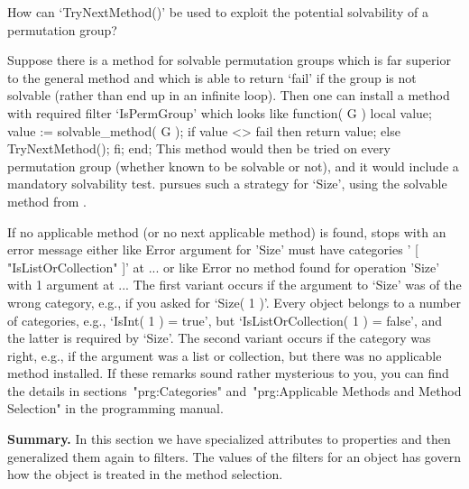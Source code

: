%
\exercise How  can  `TryNextMethod()' be used   to exploit  the potential
solvability of a permutation group?

\answer Suppose  there is a method for  solvable permutation groups which
is far superior to the general method and which  is able to return `fail'
if the  group is not solvable  (rather than end up  in an infinite loop).
Then one can install a  method with  required filter `IsPermGroup'  which
looks like
\begintt
    function( G )
    local  value;
        value := solvable_method( G );
        if value <> fail  then  return value;
                          else  TryNextMethod();  fi;
    end;
\endtt
This method would then be tried on every permutation group (whether known
to be  solvable or  not),  and it would  include a  mandatory solvability
test.  {\GAP} pursues  such  a strategy for   `Size',  using the solvable
method from \cite{Sims90b}.

\edef\solsimsex{\the\chapno.\the\exno}%
If no applicable method  (or no next applicable  method) is found, {\GAP}
stops with an error message either like
\begintt
    Error argument for 'Size' must have categories '
    [ "IsListOrCollection" ]' at ...
\endtt
or like
\begintt
    Error no method found for operation 'Size' with 1 argument at ...
\endtt
The  first variant occurs  if the  argument to   `Size' was of  the wrong
category, e.g., if you asked for `Size( 1 )'. Every {\GAP} object belongs
to  a  number of     categories,   e.g., `IsInt(   1    ) =  true',   but
`IsListOrCollection( 1 ) = false', and  the latter is required by `Size'.
The  second variant   occurs if the   category  was right, e.g.,   if the
argument  was a list  or collection,  but there  was no applicable method
installed. If these remarks sound rather mysterious  to you, you can find
the details in  sections~"prg:Categories" and~"prg:Applicable Methods and
Method Selection" in the programming manual.

{\bf  Summary.}  In   this section  we  have   specialized  attributes to
properties and then generalized them again to  filters. The values of the
filters for an object has govern how the  object is treated in the method
selection.

\null

